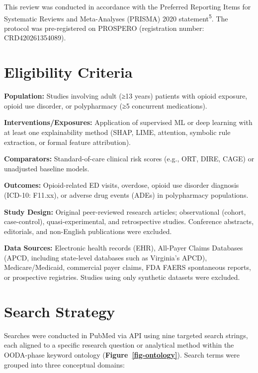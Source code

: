\documentclass[
  12pt,
]{book}
\begin{document}
This review was conducted in accordance with the Preferred Reporting
Items for Systematic Reviews and Meta-Analyses (PRISMA) 2020
statement\textsuperscript{5}. The protocol was pre-registered on
PROSPERO (registration number: CRD420261354089).

\section{Eligibility Criteria}\label{eligibility-criteria}

\textbf{Population:} Studies involving adult (≥13 years) patients with
opioid exposure, opioid use disorder, or polypharmacy (≥5 concurrent
medications).

\textbf{Interventions/Exposures:} Application of supervised ML or deep
learning with at least one explainability method (SHAP, LIME, attention,
symbolic rule extraction, or formal feature attribution).

\textbf{Comparators:} Standard-of-care clinical risk scores (e.g., ORT,
DIRE, CAGE) or unadjusted baseline models.

\textbf{Outcomes:} Opioid-related ED visits, overdose, opioid use
disorder diagnosis (ICD-10: F11.xx), or adverse drug events (ADEs) in
polypharmacy populations.

\textbf{Study Design:} Original peer-reviewed research articles;
observational (cohort, case-control), quasi-experimental, and
retrospective studies. Conference abstracts, editorials, and non-English
publications were excluded.

\textbf{Data Sources:} Electronic health records (EHR), All-Payer Claims
Databases (APCD, including state-level databases such as Virginia's
APCD), Medicare/Medicaid, commercial payer claims, FDA FAERS spontaneous
reports, or prospective registries. Studies using only synthetic
datasets were excluded.

\section{Search Strategy}\label{search-strategy}

Searches were conducted in PubMed via API using nine targeted search
strings, each aligned to a specific research question or analytical
method within the OODA-phase keyword ontology
(\textbf{Figure~\ref{fig-ontology}}). Search terms were grouped into
three conceptual domains:
\end{document}

